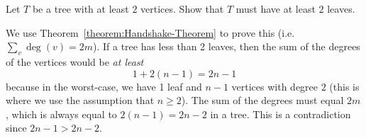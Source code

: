\begin{flex}
\begin{exercise} \label{exercise:A-tree-has-at-least-2-leaves}
Let $T$ be a tree with at least $2$ vertices. Show that $T$ must have at least $2$ leaves.
\end{exercise}

\begin{solution}
We use Theorem~\ref{theorem:Handshake-Theorem} to prove this (i.e. $\sum_v \deg(v) = 2m$). If a tree has less than 2 leaves, then the sum of the degrees of the vertices would be \emph{at least} $$1 + 2(n-1) = 2n - 1$$ because in the worst-case, we have 1 leaf and $n-1$ vertices with degree $2$ (this is where we use the assumption that $n \geq 2$). The sum of the degrees must equal $2m$, which is always equal to $2(n-1) = 2n - 2$ in a tree. This is a contradiction since $2n-1 > 2n-2$.
\end{solution}
\end{flex}


